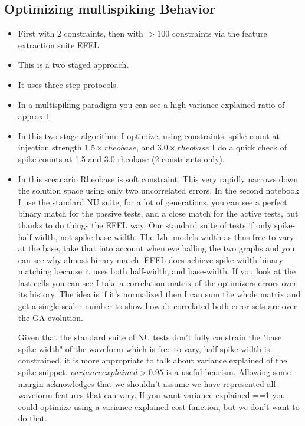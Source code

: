 \documentclass{article}
\begin{document}
\subsection{Optimizing multispiking Behavior}
\begin{itemize}
\item First with $2$ constraints, then with $>100$ constraints via the feature extraction suite EFEL

\item This is a two staged approach. 
\item It uses three step protocols.

\item In a multispiking paradigm you can see a high variance explained ratio of approx $1$.  

\item In this two stage algorithm: I optimize, using constraints: spike count at injection strength $1.5 \times rheobase $, and $3.0 \times rheobase $
I do a quick check of spike counts at 1.5 and 3.0 rheobase (2 constriants only).

\item In this sceanario Rheobase is soft constraint.  This very rapidly narrows down the solution space using only two uncorrelated errors. In the second notebook I use the standard NU suite, for a lot of generations, you can see a perfect binary match for the passive tests, and a close match for the active tests, but thanks to do things the EFEL way. Our standard suite of tests if only spike-half-width, not spike-base-width. The Izhi models width as thus free to vary at the base, take that into account when eye balling the two graphs and you can see why almost binary match. EFEL does achieve spike width binary matching because it uses both half-width, and base-width. If you look at the last cells you can see I take a correlation matrix of the optimizers errors over its history. The idea is if it's normalized then I can sum the whole matrix and get a single scaler number to show how de-correlated both error sets are over the GA evolution. 

Given that the standard suite of NU tests don't fully constrain the "base spike width" of the waveform which is free to vary, half-spike-width is constrained, it is more appropriate to talk about variance explained of the spike snippet. $variance explained>0.95$ is a useful heurism. Allowing some margin acknowledges that we shouldn't assume we have represented all waveform features that can vary. If you want variance explained ==1   you could optimize using a variance explained cost function, but we don't want to do that. 
\end{itemize}





\end{document}
